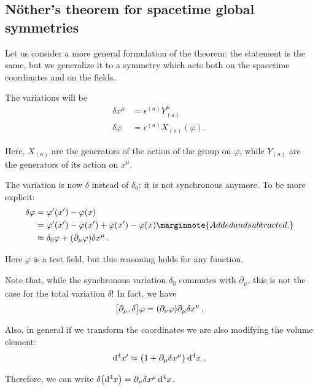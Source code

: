 \documentclass[main.tex]{subfiles}
\begin{document}
\subsection{Nöther's theorem for spacetime global symmetries}

Let us consider a more general formulation of the theorem: the statement is the same, but we generalize it to a symmetry which acts both on the spacetime coordinates and on the fields. 

The variations will be 
%
\begin{align}
\delta {x^{\mu }} &= \epsilon^{(a)} Y_{(a)}^{\mu }  \\
\delta \varphi &= \epsilon^{(a)} X_{(a)}(\varphi )
\,.
\end{align}

Here, \(X_{(a)}\) are the generators of the action of the group on \(\varphi \), while \(Y_{(a)}\) are the generators of its action on \(x^{\mu }\). 

The variation is now \(\delta \) instead of \(\delta_0 \): it is not synchronous anymore. To be more explicit: 
%
\begin{align}
\delta \varphi &= \varphi' (x') - \varphi (x)  \\
&= \varphi ' (x') - \varphi (x') + \varphi (x') - \varphi (x)  \marginnote{Added and subtracted.}\\
&\approx  \delta_0 \varphi + (\partial_{\mu } \varphi ) \delta x^{\mu }
\,.
\end{align}

Here \(\varphi \) is a test field, but this reasoning holds for any function. 

Note that, while the synchronous variation \(\delta_0\) commutes with \(\partial_{\mu }\), this is not the case for the total variation \(\delta \)! In fact, we have 
%
\begin{align}
\qty[\partial_{\mu }, \delta ] \varphi = \qty(\partial_{\nu } \varphi ) \partial_{\mu } \delta x^{\nu }
\,.
\end{align}

Also, in general if we transform the coordinates we are also modifying the volume element: 
%
\begin{align}
\dd[4]{x'} \approx \qty(1 + \partial_{\mu } \delta x^{\mu }) \dd[4]{x}
\,.
\end{align}

Therefore, we can write \(\delta \qty(\dd[4]{x}) = \partial_{\mu } \delta x^{\mu } \dd[4]{x}\).
\end{document}
